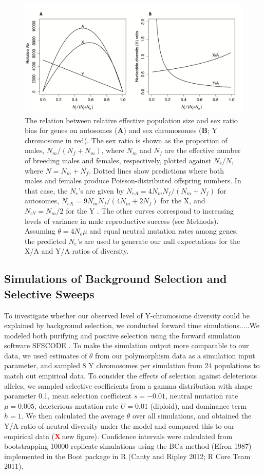\documentclass[9pt,twocolumn,twoside]{gsajnl}
\newcommand{\X}{\textcolor{red}{\bf X\,}}
\begin{document}
\begin{figure}[htbp]
\centering
\includegraphics[width=\linewidth]{Figure1.png}
\caption{The relation between relative effective population size and sex ratio bias for genes on autosomes (\textbf{A}) and sex chromosomes (\textbf{B}; Y chromosome in red). The sex ratio is shown as the proportion of males, $N_{m}/(N_{f}+N_{m})$, where $N_{m}$ and $N_{f}$ are the effective number of breeding males and females, respectively, plotted against $N_{e}/N$, where $N=N_{m}+N_{f}$. Dotted lines show predictions where both males and females produce Poisson-distributed offspring numbers. In that case, the $N_{e}$'s are given by $N_{e{A}}=4N_{m}N_{f}/(N_{m}+N_{f})$ for autosomes, $N_{e{X}}=9N_{m}N_{f}/(4N_{m}+2N_{f})$ for the X, and $N_{e{Y}}=N_{m}/2$ for the Y \citep{wright1931evolution}. The other curves correspond to increasing levels of variance in male reproductive success \citep{nomura2002effective} (see Methods). Assuming $\theta=4N_{e}\mu$ and equal neutral mutation rates among genes, the predicted $N_{e}$'s are used to generate our null expectations for the X/A and Y/A ratios of diversity.  
}%
\label{fig:spectrum}
\end{figure}

\subsection*{Simulations of Background Selection and Selective Sweeps}
To investigate whether our observed level of Y-chromosome diversity could be explained by background selection, we conducted forward time simulations.....We modeled both purifying and positive selection using the forward simulation software SFSCODE \citep{hernandez2008flexible}. To make the simulation output more comparable to our data, we used estimates of $\theta$ from our polymorphism data as a simulation input parameter, and sampled 8 Y chromosomes per simulation from 24 populations to match out empirical data. To consider the effects of selection against deleterious alleles, we sampled selective coefficients from a gamma distribution with shape parameter 0.1, mean selection coefficient $s=-0.01$, neutral mutation rate $\mu = 0.005$, deleterious mutation rate $U=0.01$ (diploid), and dominance term $h=1$. We then calculated the average $\theta$ over all simulations, and obtained the Y/A ratio of neutral diversity under the model and compared this to our empirical data (\X new figure). Confidence intervals were calculated from bootstrapping 10000 replicate simulations  using the BCa method (Efron 1987) implemented in the Boot package in R (Canty and Ripley 2012; R Core Team 2011). 
\end{document}
